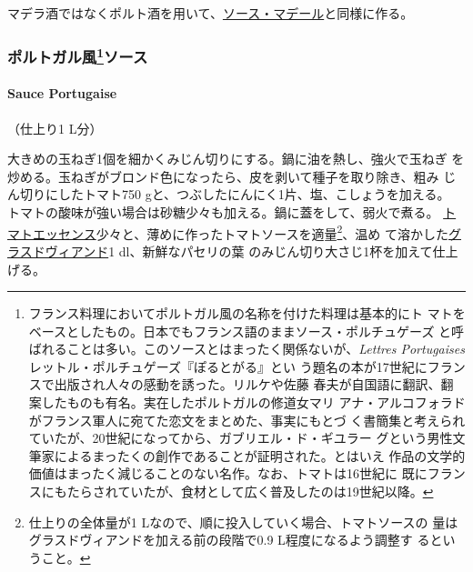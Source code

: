 
マデラ酒ではなくポルト酒を用いて、\protect\hyperlink{sauce-madere}{ソース・マデール}と同様に作る。

\maeaki

\hypertarget{ux30ddux30ebux30c8ux30acux30ebux98a873ux30bdux30fcux30b9}{%
\subsubsection[ポルトガル風ソース]{\texorpdfstring{ポルトガル風\footnote{フランス料理においてポルトガル風の名称を付けた料理は基本的にト
  マトをベースとしたもの。日本でもフランス語のままソース・ポルチュゲーズ
  と呼ばれることは多い。このソースとはまったく関係ないが、\emph{Lettres
  Portugaises} レットル・ポルチュゲーズ『ぽるとがる』とい
  う題名の本が17世紀にフランスで出版され人々の感動を誘った。リルケや佐藤
  春夫が自国語に翻訳、翻案したものも有名。実在したポルトガルの修道女マリ
  アナ・アルコフォラドがフランス軍人に宛てた恋文をまとめた、事実にもとづ
  く書簡集と考えられていたが、20世紀になってから、ガブリエル・ド・ギユラー
  グという男性文筆家によるまったくの創作であることが証明された。とはいえ
  作品の文学的価値はまったく減じることのない名作。なお、トマトは16世紀に
  既にフランスにもたらされていたが、食材として広く普及したのは19世紀以降。}ソース}{ポルトガル風ソース}}\label{ux30ddux30ebux30c8ux30acux30ebux98a873ux30bdux30fcux30b9}}

\hypertarget{sauce-portugaise}{%
\paragraph{Sauce Portugaise}\label{sauce-portugaise}}


（仕上り1 L分）

大きめの玉ねぎ1個を細かくみじん切りにする。鍋に油を熱し、強火で玉ねぎ
を炒める。玉ねぎがブロンド色になったら、皮を剥いて種子を取り除き、粗み
じん切りにしたトマト750 gと、つぶしたにんにく1片、塩、こしょうを加える。
トマトの酸味が強い場合は砂糖少々も加える。鍋に蓋をして、弱火で煮る。
\href{}{トマトエッセンス}少々と、薄めに作ったトマトソースを適量\footnote{仕上りの全体量が1
  Lなので、順に投入していく場合、トマトソースの
  量はグラスドヴィアンドを加える前の段階で0.9 L程度になるよう調整す
  るということ。}、温め
て溶かした\protect\hyperlink{glace-de-viande}{グラスドヴィアンド}1
dl、新鮮なパセリの葉 のみじん切り大さじ1杯を加えて仕上げる。

